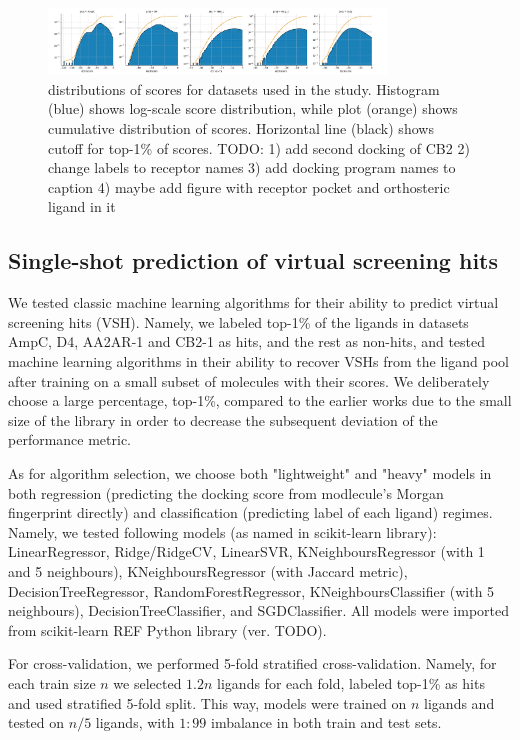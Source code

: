 \begin{figure}[h]
\centering
\includegraphics[width=0.8\textwidth]{figures/Figure_1.png}
\caption{distributions of scores for datasets used in the study. Histogram (blue) shows log-scale score distribution, while plot (orange) shows cumulative distribution of scores. Horizontal line (black) shows cutoff for top-1\% of scores. TODO: 1) add second docking of CB2 2) change labels to receptor names 3) add docking program names to caption 4) maybe add figure with receptor pocket and orthosteric ligand in it}
\label{fig:fig_1}
\end{figure}


\subsection{Single-shot prediction of virtual screening hits}
We tested classic machine learning algorithms for their ability to predict virtual screening hits (VSH). Namely, we labeled top-1\% of the ligands in datasets AmpC, D4, AA2AR-1 and CB2-1 as hits, and the rest as non-hits, and tested machine learning algorithms in their ability to recover VSHs from the ligand pool after training on a small subset of molecules with their scores. We deliberately choose a large percentage, top-1\%, compared to the earlier works \cite{Graff2021AcceleratingLearning, logistic_regression, Yang2021_shoichet_active_learning} due to the small size of the library in order to decrease the subsequent deviation of the performance metric.

As for algorithm selection, we choose both "lightweight" and "heavy" models in both regression (predicting the docking score from modlecule's Morgan fingerprint directly) and classification (predicting label of each ligand) regimes. Namely, we tested following models (as named in scikit-learn library): LinearRegressor, Ridge/RidgeCV, LinearSVR, KNeighboursRegressor (with 1 and 5 neighbours), KNeighboursRegressor (with Jaccard metric), DecisionTreeRegressor, RandomForestRegressor, KNeighboursClassifier (with 5 neighbours), DecisionTreeClassifier, and SGDClassifier. All models were imported from scikit-learn REF Python library (ver. TODO). 

For cross-validation, we performed 5-fold stratified cross-validation. Namely, for each train size $n$ we selected $1.2n$ ligands for each fold, labeled top-1\% as hits and used stratified 5-fold split. This way, models were trained on $n$ ligands and tested on $n/5$ ligands, with $1:99$ imbalance in both train and test sets.

